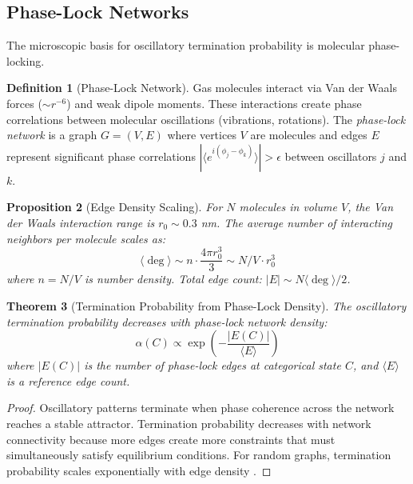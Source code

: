 \documentclass[twocolumn,superscriptaddress,prb,10pt]{revtex4-2}
\newtheorem{theorem}{Theorem}
\newtheorem{proposition}[theorem]{Proposition}
\theoremstyle{definition}
\newtheorem{definition}[theorem]{Definition}
\theoremstyle{remark}
\begin{document}
\subsection{Phase-Lock Networks}

The microscopic basis for oscillatory termination probability is molecular phase-locking.

\begin{definition}[Phase-Lock Network]
Gas molecules interact via Van der Waals forces ($\sim r^{-6}$) and weak dipole moments. These interactions create phase correlations between molecular oscillations (vibrations, rotations). The \emph{phase-lock network} is a graph $G = (V, E)$ where vertices $V$ are molecules and edges $E$ represent significant phase correlations $|\langle e^{i(\phi_j - \phi_k)}\rangle| > \epsilon$ between oscillators $j$ and $k$.
\end{definition}

\begin{proposition}[Edge Density Scaling]
For $N$ molecules in volume $V$, the Van der Waals interaction range is $r_0 \sim 0.3$ nm. The average number of interacting neighbors per molecule scales as:
\begin{equation}
\langle \deg \rangle \sim n \cdot \frac{4\pi r_0^3}{3} \sim N/V \cdot r_0^3
\end{equation}
where $n = N/V$ is number density. Total edge count: $|E| \sim N \langle \deg \rangle / 2$.
\end{proposition}

\begin{theorem}[Termination Probability from Phase-Lock Density]
\label{thm:alpha_topology}
The oscillatory termination probability decreases with phase-lock network density:
\begin{equation}
\alpha(C) \propto \exp\left(-\frac{|E(C)|}{\langle E \rangle}\right)
\end{equation}
where $|E(C)|$ is the number of phase-lock edges at categorical state $C$, and $\langle E \rangle$ is a reference edge count.
\end{theorem}

\begin{proof}
Oscillatory patterns terminate when phase coherence across the network reaches a stable attractor. Termination probability decreases with network connectivity because more edges create more constraints that must simultaneously satisfy equilibrium conditions. For random graphs, termination probability scales exponentially with edge density \cite{kuramoto1975,strogatz2000}.
\end{proof}
\end{document}
